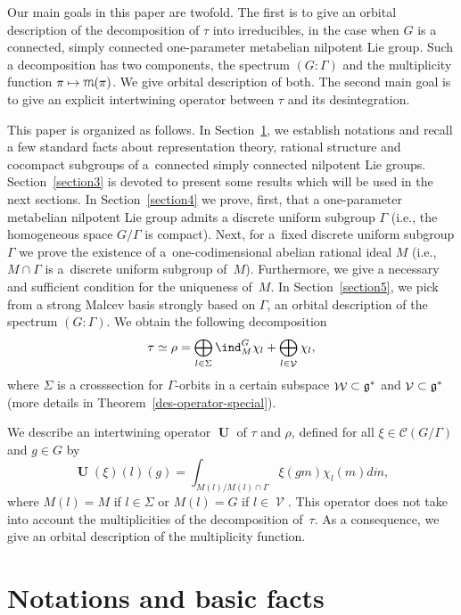 \documentclass[pdftex]{sigma}
\DeclareMathOperator{\U}{\mathbf{U}}
\DeclareMathOperator{\nongen}{\mathcal{V}}
\DeclareMathOperator{\gen}{\mathcal{W}}
\def\mult{\mbox{\usefont{T1}{cmfr}{m}{it}
  \selectfont m}}
\begin{document}
Our main goals in this paper are twofold. The f\/irst is to give an
orbital description of the decomposition of $\tau$ into
irreducibles, in the case when $G$ is a connected, simply connected
one-parameter metabelian nilpotent Lie group. Such a decomposition
has two components, the spectrum $(G:\Gamma)$ and the multiplicity
function $\pi \mapsto \mult(\pi)$. We give orbital description
of both. The second main goal is to give an explicit intertwining
operator between $\tau$ and its desintegration.

 This
paper is organized as follows. In Section~\ref{section2}, we establish
notations and recall a few standard facts about representation
theory, rational structure and cocompact subgroups of a~connected
simply connected nilpotent Lie groups. Section~\ref{section3} is devoted to
present some results which will be used in the next sections. In
Section~\ref{section4} we prove, f\/irst, that a one-parameter metabelian
nilpotent Lie group admits a discrete uniform subgroup $ \Gamma$
(i.e., the homogeneous space $G/ \Gamma$ is compact). Next, for a~f\/ixed discrete uniform subgroup $\Gamma$ we prove the existence of a~one-codimensional abelian rational ideal $M$  (i.e., $M \cap \Gamma
$ is a~discrete uniform subgroup of~$M$). Furthermore, we give a
necessary and suf\/f\/icient condition for the uniqueness of~$M$. In
Section~\ref{section5}, we pick from a strong Malcev basis strongly based on
$\Gamma$, an orbital description of the spectrum $(G:\Gamma)$. We
obtain the following decomposition
\begin{gather*}%
\tau \simeq \rho =   \bigoplus_{l \in \Sigma}\ind_M^G\chi_l +
\bigoplus_{l\in \nongen} \chi_l,
\end{gather*}
 where   $\Sigma$ is a crosssection for
$\Gamma$-orbits in a certain subspace  $\gen \subset \frak g^*$ and
$\nongen\subset \frak g^*$ (more details in Theorem~\ref{des-operator-special}).

We describe an intertwining operator $\U$ of $\tau $ and $\rho$,
  def\/ined for all  $\xi\in \mathcal{C}(G/\Gamma)$ and $g\in G$ by
\[
 \U(\xi)(l)(g) =
    \int_{M(l)/M(l)\cap \Gamma} \xi(gm) \chi_l(m) d\dot{m},
\]
where $M(l)= M$ if  $l\in \Sigma$ or $ M(l) = G $ if $ l\in\nongen$.
This operator does not take into account the
 multiplicities of the decomposition of~$\tau$.
As a consequence, we give an orbital  description of the
multiplicity function.

\section{Notations and basic facts} \label{section2}
\end{document}
